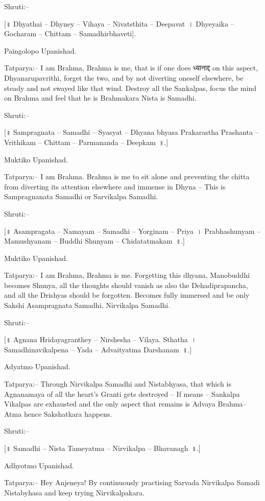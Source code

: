 Shruti:–

[॥ Dhyathai – Dhyney – Vihaya – Nivatsthita – Deepavat~। Dhyeyaika – Gocharam – Chittam – Samadhirbhaveti].

Paingolopo Upanishad.

Tatparya:– I am Brahma, Brahma is me, that is if one does ध्यानाद्द on this aspect, Dhyanarupavrithi, forget the two, and by not diverting oneself elsewhere, be steady and not swayed like that wind. Destroy all the Sankalpas, focus the mind on Brahma and feel that he is Brahmakara Nista is Samadhi.

Shruti:–

[॥ Sampragnata – Samadhi – Syasyat – Dhyana bhyasa Prakarastha Prashanta – Vrithikam – Chittam – Parmananda – Deepkam~॥.]

Muktiko Upanishad.

Tatparya:– I am Brahma. Brahma is me to sit alone and preventing the chitta from diverting its attention elsewhere and immense in Dhyna – This is Sampragnanata Samadhi or Sarvikalpa Samadhi.

Shruti:–

[॥ Asampragata – Namayam – Samadhi – Yorginam – Priya~। Prabhashunyam – Mamushyanam – Buddhi Shunyam – Chidatatmakam~॥.]

Muktiko Upanishad.

Tatparya:– I am Brahma, Brahma is me. Forgetting this dhyana, Manobuddhi becomes Shunya, all the thoughts should vanish as also the Dehadiprapancha, and all the Drishyas should be forgotten. Becomes fully immersed and be only Sakshi Asampragnata Samadhi, Nirvikalpa Samadhi.

Shruti:–

[॥ Agnana Hridayagranthey – Nirshesha – Vilaya. Sthatha~। Samadhinavikalpena – Yada – Advaityatma Darshanam~॥.]

Adyatmo Upanishad.

Tatparya:– Through Nirvikalpa Samadhi and Nistabhyasa, that which is Agnanamaya of all the heart's Granti gets destroyed – If means – Sankalpa Vikalpas are exhausted and the only aspect that remains is Advaya Brahma–Atma hence Sakshatkara happens.

Shruti:–

[॥ Samadhi – Nista Tameyatma – Nirvikalpa – Bhavanagh~॥.]

Adhyotmo Upanishad.

Tatparya:– Hey Anjeneya! By continuously practising Sarvada Nirvikalpa Samadi Nistabyhasa and keep trying Nirvikalpakara.

